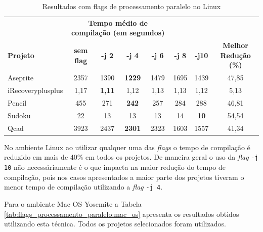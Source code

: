 \begin{table}[!ht]
\tiny
\centering
\caption{Resultados com flags de processamento paralelo no Linux}
\label{tab:flags_processamento_paralelo:linux}
\begin{tabular}{lccccccc}
& \multicolumn{4}{c}{\textbf{Tempo médio de compilação (em segundos)} } \\
\textbf{Projeto} & \textbf{sem flag} & \textbf{-j 2} & \textbf{-j 4} & \textbf{-j 6} & \textbf{-j 8} & \textbf{-j10} &  \textbf{Melhor Redução (\%)} \\ \toprule
Aseprite            & 2357  & 1390              & \textbf{1229} & 1479  & 1695      & 1439          & 47,85  \\ 
iRecoveryplusplus   & 1,17  & \textbf{1,11}     &  1,12         & 1,13  & 1,13      & 1,12          & 5,13 \\ 
Pencil              & 455   & 271               & \textbf{242}  & 257   & 284       & 288           &  46,81 \\ 
Sudoku              & 22    & 13                & 13            & 13    & 14        & \textbf{10}   & 54,54  \\ 
Qcad                & 3923  & 2437              & \textbf{2301} & 2323  & 1603      & 1557          & 41,34 \\ 
\end{tabular}
\end{table}

No ambiente Linux ao utilizar qualquer uma das \textit{flags} o tempo de compilação é
 reduzido em mais de 40\% em todos os projetos. De maneira geral o uso
 da \textit{flag} \texttt{-j 10} não necessáriamente é o
 que impacta na maior redução do tempo de compilação, pois nos casos
 apresentados a maior parte dos projetos tiveram o menor
 tempo de compilação utilizando a \textit{flag} \texttt{-j 4}.

Para o ambiente Mac OS Yosemite a Tabela \ref{tab:flags_processamento_paralelo:mac_os} apresenta os resultados obtidos utilizando esta técnica. Todos os projetos selecionados foram utilizados.

